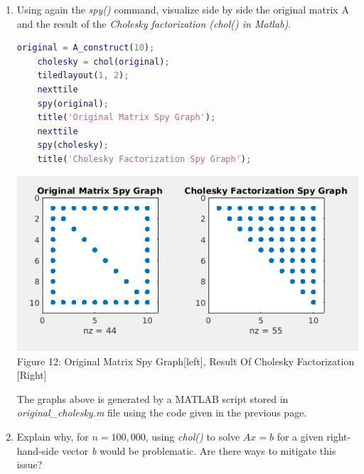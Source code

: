 \documentclass[unicode,11pt,a4paper,oneside,numbers=endperiod,openany]{scrartcl}
\begin{document}
\begin{enumerate}
{The function \textit{A\_construct()} has time complexity of $O(n^2)$. In the code below, to express inequality an exclamation mark($!=$) is used for readability, but in MATLAB tilde($\sim =$) symbol is used.}

\begin{lstlisting}[language=Matlab]
    function nnm = A_construct(n)
        A = sparse(zeros(n,n));
        for i = 1:n
            for j = 1:n
                if (i == 1 || i == n || j == 1 || j == n) && i != j
                    A(i, j) = 1;
                elseif i == j
                    A(i, j) = n + i - 1;
                end
            end
        end
        nnm = A;
    end
\end{lstlisting}

\item {Using again the \textit{spy()} command, visualize side by side the original matrix A and the result of the \textit{Cholesky factorization (chol() in Matlab)}.} \\
\begin{lstlisting}[language=Matlab]
    original = A_construct(10);
    cholesky = chol(original);
    tiledlayout(1, 2);
    nexttile
    spy(original);
    title('Original Matrix Spy Graph');
    nexttile
    spy(cholesky);
    title('Cholesky Factorization Spy Graph');
\end{lstlisting}

\begin{center}
  \includegraphics[width=0.8\linewidth]{./images/n10OC.png}\\
  \label{fig:Original and Cholesky factorization graphs}
  {Figure 12: Original Matrix Spy Graph[left], Result Of Cholesky Factorization [Right]}
\end{center}

{The graphs above is generated by a MATLAB script stored in \textit{original\_cholesky.m} file using the code given in the previous page.}

\item Explain why, for $n = 100, 000$, using \textit{chol()} to solve $Ax = b$ for a given right-hand-side vector \textit{b} would be problematic. Are there ways to mitigate this issue?


\end{enumerate}
\end{document}
